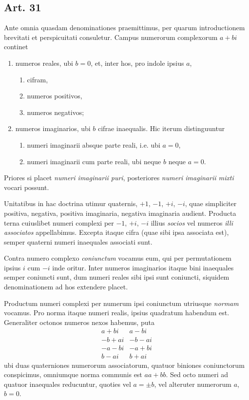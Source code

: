 \documentclass[12pt]{article}
\newcommand{\art}[1]{\subsection*{Art. #1}}
\begin{document}
\art{31}

Ante omnia quasdam denominationes praemittimus, per quarum introductionem brevitati et perspicuitati consuletur. Campus numerorum complexorum $a+bi$ continet

\begin{enumerate}[label=\Roman*.]
\item numeros reales, ubi $b=0$, et, inter hos, pro indole ipsius $a$,
    \begin{enumerate}[label=\arabic*)]
    \item cifram,
    \item numeros positivos,
    \item numeros negativos;
    \end{enumerate}
\item numeros imaginarios, ubi $b$ cifrae inaequalis. Hic iterum distinguuntur
    \begin{enumerate}[label=\arabic*)]
    \item numeri imaginarii absque parte reali, i.e. ubi $a=0$,
    \item numeri imaginarii cum parte reali, ubi neque $b$ neque $a=0$.
    \end{enumerate}
\end{enumerate}

Priores si placet \textit{numeri imaginarii puri}, posteriores \textit{numeri imaginarii mixti} vocari possunt.

Unitatibus in hac doctrina utimur quaternis, $+1$, $-1$, $+i$, $-i$, quae simpliciter positiva, negativa, positiva imaginaria, negativa imaginaria audient. Producta terna cuiuslibet numeri complexi per $-1$, $+i$, $-i$ illius \textit{socios} vel numeros \textit{illi associatos} appellabimus. Excepta itaque cifra (quae sibi ipsa associata est), semper quaterni numeri inaequales associati sunt.

Contra numero complexo \textit{coniunctum} vocamus eum, qui per permutationem ipsius $i$ cum $-i$ inde oritur. Inter numeros imaginarios itaque bini inaequales semper coniuncti sunt, dum numeri reales sibi ipsi sunt coniuncti, siquidem denominationem ad hos extendere placet.

Productum numeri complexi per numerum ipsi coniunctum utriusque \textit{normam} vocamus. Pro norma itaque numeri realis, ipsius quadratum habendum est. Generaliter octonos numeros nexos habemus, puta
\[
\begin{array}{r|r}
 a+bi & a-bi\\
 -b+ai & -b-ai\\
 -a-bi & -a+bi\\
 b-ai & b+ai
\end{array}
\]
ubi duas quaterniones numerorum associatorum, quatuor biniones coniunctorum conspicimus, omniumque norma communis est $aa+bb$. Sed octo numeri ad quatuor inaequales reducuntur, quoties vel $a=\pm b$, vel alteruter numerorum $a$, $b=0$.
\end{document}
